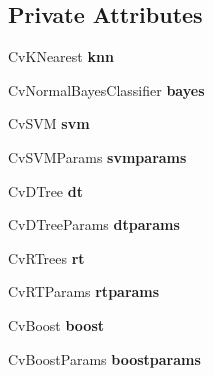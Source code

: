 \subsection*{\-Private \-Attributes}
\begin{DoxyCompactItemize}
\item 
\hypertarget{class_m_l_alg_af8bcdfcf8875738e5a223ce1d2b733ce}{\-Cv\-K\-Nearest {\bfseries knn}}\label{class_m_l_alg_af8bcdfcf8875738e5a223ce1d2b733ce}

\item 
\hypertarget{class_m_l_alg_ada96139781f275d06c037aaa1a56f89c}{\-Cv\-Normal\-Bayes\-Classifier {\bfseries bayes}}\label{class_m_l_alg_ada96139781f275d06c037aaa1a56f89c}

\item 
\hypertarget{class_m_l_alg_a89bf01fc27eb09936437aeb06aba1245}{\-Cv\-S\-V\-M {\bfseries svm}}\label{class_m_l_alg_a89bf01fc27eb09936437aeb06aba1245}

\item 
\hypertarget{class_m_l_alg_aa2d51dc23079b08c7596edadfd405126}{\-Cv\-S\-V\-M\-Params {\bfseries svmparams}}\label{class_m_l_alg_aa2d51dc23079b08c7596edadfd405126}

\item 
\hypertarget{class_m_l_alg_a08428a16d0fca701be9d039e82678d44}{\-Cv\-D\-Tree {\bfseries dt}}\label{class_m_l_alg_a08428a16d0fca701be9d039e82678d44}

\item 
\hypertarget{class_m_l_alg_a745160bb70856bd038a5483cd820fa1b}{\-Cv\-D\-Tree\-Params {\bfseries dtparams}}\label{class_m_l_alg_a745160bb70856bd038a5483cd820fa1b}

\item 
\hypertarget{class_m_l_alg_ab90889f7a4f9545a9e2aa3136a52e1cd}{\-Cv\-R\-Trees {\bfseries rt}}\label{class_m_l_alg_ab90889f7a4f9545a9e2aa3136a52e1cd}

\item 
\hypertarget{class_m_l_alg_a274170d71d4a78ae53106008112b397d}{\-Cv\-R\-T\-Params {\bfseries rtparams}}\label{class_m_l_alg_a274170d71d4a78ae53106008112b397d}

\item 
\hypertarget{class_m_l_alg_ae29c03c54a7730fdc4dfd0a5444aacb6}{\-Cv\-Boost {\bfseries boost}}\label{class_m_l_alg_ae29c03c54a7730fdc4dfd0a5444aacb6}

\item 
\hypertarget{class_m_l_alg_a5381eac6f165bca57c94006eacc1ecbf}{\-Cv\-Boost\-Params {\bfseries boostparams}}\label{class_m_l_alg_a5381eac6f165bca57c94006eacc1ecbf}


\end{DoxyCompactItemize}
